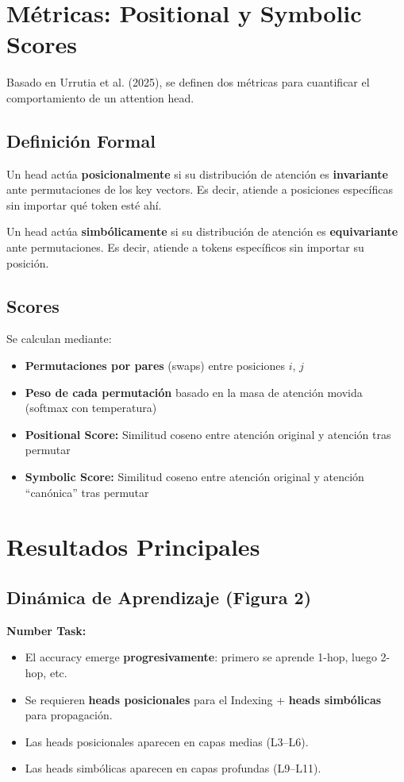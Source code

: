 \documentclass[conference]{IEEEtran}
\begin{document}
\section{M\'etricas: Positional y Symbolic Scores}

Basado en Urrutia et al. (2025), se definen dos m\'etricas para cuantificar el comportamiento de un attention head.

\subsection{Definici\'on Formal}

Un head act\'ua \textbf{posicionalmente} si su distribuci\'on de atenci\'on es \textbf{invariante} ante permutaciones de los key vectors. Es decir, atiende a posiciones espec\'ificas sin importar qu\'e token est\'e ah\'i.

Un head act\'ua \textbf{simb\'olicamente} si su distribuci\'on de atenci\'on es \textbf{equivariante} ante permutaciones. Es decir, atiende a tokens espec\'ificos sin importar su posici\'on.

\subsection{Scores}

Se calculan mediante:
\begin{itemize}
    \item \textbf{Permutaciones por pares} (swaps) entre posiciones $i$, $j$
    \item \textbf{Peso de cada permutaci\'on} basado en la masa de atenci\'on movida (softmax con temperatura)
    \item \textbf{Positional Score:} Similitud coseno entre atenci\'on original y atenci\'on tras permutar
    \item \textbf{Symbolic Score:} Similitud coseno entre atenci\'on original y atenci\'on ``can\'onica'' tras permutar
\end{itemize}

\section{Resultados Principales}

\subsection{Din\'amica de Aprendizaje (Figura 2)}

\textbf{Number Task:}
\begin{itemize}
    \item El accuracy emerge \textbf{progresivamente}: primero se aprende 1-hop, luego 2-hop, etc.
    \item Se requieren \textbf{heads posicionales} para el Indexing + \textbf{heads simb\'olicas} para propagaci\'on.
    \item Las heads posicionales aparecen en capas medias (L3--L6).
    \item Las heads simb\'olicas aparecen en capas profundas (L9--L11).
\end{itemize}
\end{document}
